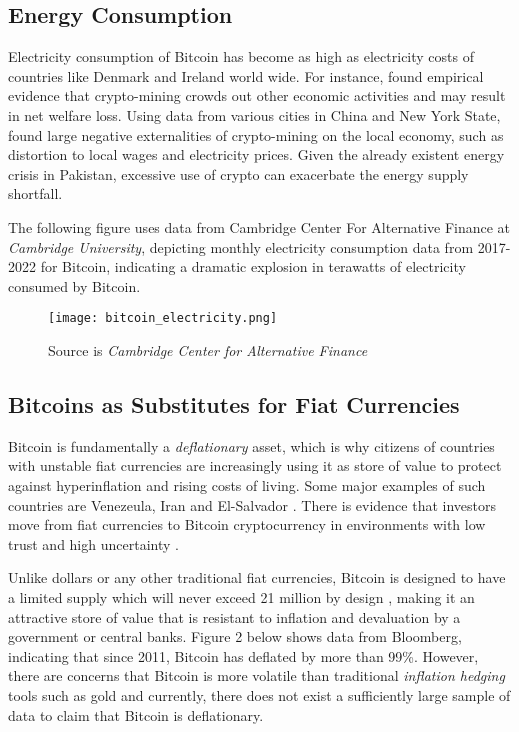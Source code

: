 \documentclass[12pt]{article}
\newcommand{\1}{\mathbbm 1}
\begin{document}
		
		\subsection{Energy Consumption}
		
		
		Electricity consumption of Bitcoin has become as high as electricity costs of countries like Denmark and Ireland \cite{sarkodie2022dataset} world wide. For instance, \cite{benetton2019} found empirical evidence that crypto-mining crowds out other economic activities and may result in net welfare loss. Using data from various cities in China and New York State, \cite{benetton2019} found large negative externalities of crypto-mining on the local economy, such as distortion to local wages and electricity prices. Given the already existent energy crisis in Pakistan, excessive use of crypto can exacerbate the energy supply shortfall.
		
		The following figure uses data from Cambridge Center For Alternative Finance at \textit{Cambridge University}, depicting monthly electricity consumption data from 2017-2022 for Bitcoin, indicating a dramatic explosion in terawatts of electricity consumed by Bitcoin.
		
		
			\begin{figure}[H]
			\begin{Center}
				\texttt{[image: bitcoin\_electricity.png]}
				\caption{Source is \textit{Cambridge Center for Alternative Finance}}
			\end{Center}
		\end{figure}
		
		
		
		
		
		
		\subsection{Bitcoins as Substitutes for Fiat Currencies}
		
		Bitcoin is fundamentally a \textit{deflationary} asset, which is why citizens of countries with unstable fiat currencies are increasingly using it as store of value to protect against hyperinflation and rising costs of living. Some major examples of such countries are Venezeula, Iran and El-Salvador \cite{nathanreiff2021}. There is evidence that investors move from fiat currencies to Bitcoin cryptocurrency in environments with low trust and high uncertainty \cite{jin2021estimating}.  
		
		Unlike dollars or any other traditional fiat currencies, Bitcoin is designed to have a limited supply which will never exceed 21 million by design \cite{nakamoto2008bitcoin}, making it an attractive store of value that is resistant to inflation and devaluation by a government or central banks. Figure 2 below shows data from Bloomberg, indicating that since 2011, Bitcoin has deflated by more than 99\%. However, there are concerns that Bitcoin is more volatile than traditional \textit{inflation hedging} tools such as gold and currently, there does not exist a sufficiently large sample of data to claim that Bitcoin is deflationary.
		
\end{document}
